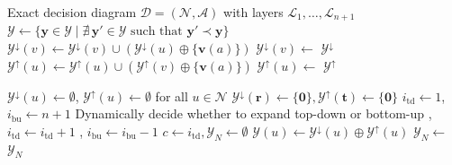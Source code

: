 \documentclass[letterpaper]{article}
\begin{document}
\begin{algorithm}[tbp!]
\caption{Coupled Pareto Frontier Enumeration}
\label{alg:coupled_pf}
\begin{algorithmic}[1]
\Require Exact decision diagram $\mathcal{D} = (\mathcal{N}, \mathcal{A})$ with layers $\mathcal{L}_1, \dots, \mathcal{L}_{n+1}$
  
    \State \Return $\mathcal{Y} \gets \{ \mathbf{y} \in \mathcal{Y} \mid \nexists \, \mathbf{y}' \in \mathcal{Y} \text{ such that } \mathbf{y}' \prec \mathbf{y} \}$    
\EndProcedure
{}
            \State $\mathcal{Y}^{\downarrow}(v) \gets \mathcal{Y}^{\downarrow}(v) \cup (\mathcal{Y}^{\downarrow}(u) \oplus \{\mathbf{v}(a)\})$
            \State $\mathcal{Y}^{\downarrow}(v) \gets$ 
        \EndFor
    \EndFor
    \State \Return $\mathcal{Y}^{\downarrow}$
\EndProcedure
{}
            \State $\mathcal{Y}^{\uparrow}(u) \gets \mathcal{Y}^{\uparrow}(u) \cup (\mathcal{Y}^{\uparrow}(v) \oplus \{\mathbf{v}(a)\})$
            \State $\mathcal{Y}^{\uparrow}(u) \gets$                     
        \EndFor
    \EndFor
    \State \Return $\mathcal{Y}^{\uparrow}$
\EndProcedure

\State $\mathcal{Y}^{\downarrow}(u) \gets \emptyset$, $\mathcal{Y}^{\uparrow}(u) \gets \emptyset$ for all $u \in \mathcal{N}$
\State $\mathcal{Y}^{\downarrow}(\mathbf{r}) \gets \{\mathbf{0}\}, \mathcal{Y}^{\uparrow}(\mathbf{t}) \gets \{\mathbf{0}\}$ 
\State $i_{\text{td}} \gets 1$, $i_{\text{bu}} \gets n+1$
    \State Dynamically decide whether to expand top-down or bottom-up
        \State {}, $i_{\text{td}} \gets i_{\text{td}} + 1$
    \Else
        \State {}, $i_{\text{bu}} \gets i_{\text{bu}} - 1$
    \EndIf
\EndWhile
\State $c \gets i_{\text{td}}, \mathcal{Y}_N \gets \emptyset$
    \State $\mathcal{Y}(u) \gets \mathcal{Y}^{\downarrow}(u) \oplus \mathcal{Y}^{\uparrow}(u)$     
\EndFor
{}
    \State $\mathcal{Y}_N \gets$ 
\EndFor
\State \Return $\mathcal{Y}_N$
\end{algorithmic}
\end{algorithm}
\end{document}

